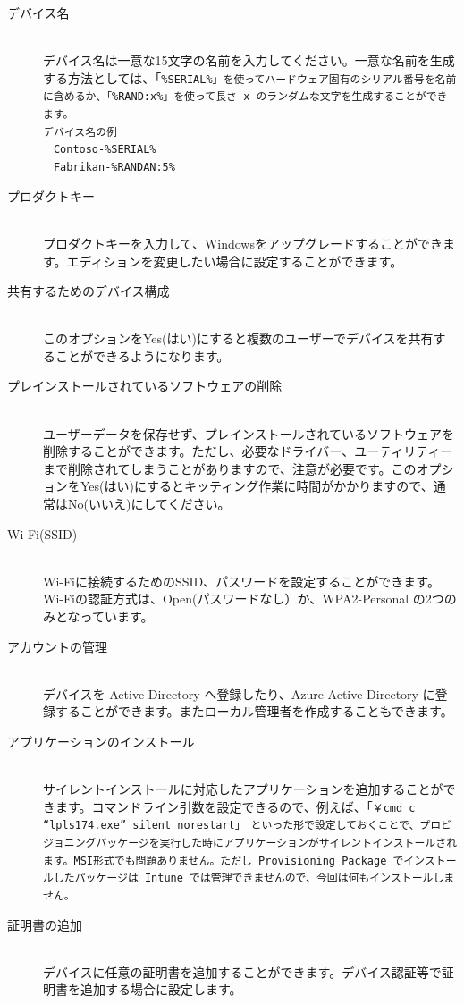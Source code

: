\begin{description}
    \item[デバイス名]\mbox{}\\
        デバイス名は一意な15文字の名前を入力してください。一意な名前を生成する方法としては、「\tt{\%SERIAL\%}」を使ってハードウェア固有のシリアル番号を名前に含めるか、「\tt{\%RAND:x\%}」を使って長さ x のランダムな文字を生成することができます。\\
        デバイス名の例\\
        　\tt{Contoso-\%SERIAL\%}\\
        　\tt{Fabrikan-\%RANDAN:5\%}
    \item[プロダクトキー]\mbox{}\\
        プロダクトキーを入力して、Windowsをアップグレードすることができます。エディションを変更したい場合に設定することができます。
    \item[共有するためのデバイス構成]\mbox{}\\
        このオプションをYes(はい)にすると複数のユーザーでデバイスを共有することができるようになります。
    \item[プレインストールされているソフトウェアの削除]\mbox{}\\
        ユーザーデータを保存せず、プレインストールされているソフトウェアを削除することができます。ただし、必要なドライバー、ユーティリティーまで削除されてしまうことがありますので、注意が必要です。このオプションをYes(はい)にするとキッティング作業に時間がかかりますので、通常はNo(いいえ)にしてください。
    \item[Wi-Fi(SSID)]\mbox{}\\
        Wi-Fiに接続するためのSSID、パスワードを設定することができます。Wi-Fiの認証方式は、Open(パスワードなし）か、WPA2-Personal の2つのみとなっています。
    \item[アカウントの管理]\mbox{}\\
        デバイスを Active Directory へ登録したり、Azure Active Directory に登録することができます。またローカル管理者を作成することもできます。
    \item[アプリケーションのインストール]\mbox{}\\
        サイレントインストールに対応したアプリケーションを追加することができます。コマンドライン引数を設定できるので、例えば、「\tt{￥cmd \/c “lpls174.exe” \/silent \/norestart}」　といった形で設定しておくことで、プロビジョニングパッケージを実行した時にアプリケーションがサイレントインストールされます。MSI形式でも問題ありません。ただし Provisioning Package でインストールしたパッケージは Intune では管理できませんので、今回は何もインストールしません。
    \item[証明書の追加]\mbox{}\\
        デバイスに任意の証明書を追加することができます。デバイス認証等で証明書を追加する場合に設定します。
\end{description}

